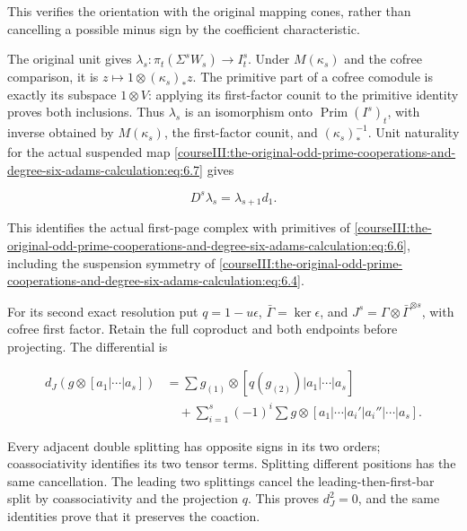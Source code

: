 This verifies the orientation with the original mapping cones, rather than cancelling a possible minus sign by the coefficient characteristic.

The original unit gives
\(\lambda_s:\pi_t(\Sigma^sW_s)\to I^s_t\).
Under \(M(\kappa_s)\) and the cofree comparison, it is \(z\mapsto1\otimes(\kappa_s)_*z\). The primitive part of a cofree comodule is exactly its subspace \(1\otimes V\): applying its first-factor counit to the primitive identity proves both inclusions. Thus \(\lambda_s\) is an isomorphism onto \(\operatorname{Prim}(I^s)_t\), with inverse obtained by \(M(\kappa_s)\), the first-factor counit, and \((\kappa_s)_*^{-1}\). Unit naturality for the actual suspended map \eqref{courseIII:the-original-odd-prime-cooperations-and-degree-six-adams-calculation:eq:6.7} gives

\begin{equation}
D^s\lambda_s=\lambda_{s+1}d_1.
 \label{courseIII:the-original-odd-prime-cooperations-and-degree-six-adams-calculation:eq:6.8}
\end{equation}

This identifies the actual first-page complex with primitives of \eqref{courseIII:the-original-odd-prime-cooperations-and-degree-six-adams-calculation:eq:6.6}, including the suspension symmetry of \eqref{courseIII:the-original-odd-prime-cooperations-and-degree-six-adams-calculation:eq:6.4}.

For its second exact resolution put \(q=1-u\epsilon\), \(\bar\Gamma=\ker\epsilon\), and
\(J^s=\Gamma\otimes\bar\Gamma^{\otimes s}\), with cofree first factor. Retain the full coproduct and both endpoints before projecting. The differential is

\begin{equation}
\begin{aligned}
 d_J(g\otimes[a_1|\cdots|a_s])
 &=\sum g_{(1)}\otimes[q(g_{(2)})|a_1|\cdots|a_s]\\
 &\quad+\sum_{i=1}^s(-1)^i\sum
 g\otimes[a_1|\cdots|a_i'|a_i''|\cdots|a_s].
\end{aligned}
\label{courseIII:the-original-odd-prime-cooperations-and-degree-six-adams-calculation:eq:6.9}
\end{equation}

Every adjacent double splitting has opposite signs in its two orders; coassociativity identifies its two tensor terms. Splitting different positions has the same cancellation. The leading two splittings cancel the leading-then-first-bar split by coassociativity and the projection \(q\). This proves \(d_J^2=0\), and the same identities prove that it preserves the coaction.

